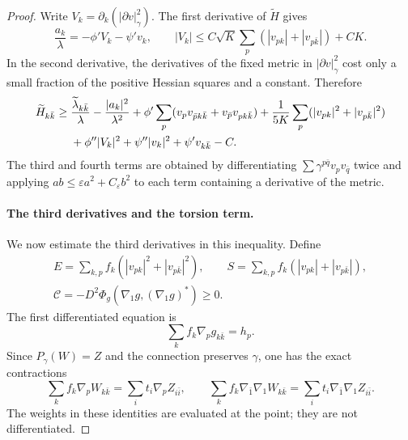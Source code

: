 \begin{proof}
Write $V_k=\partial_k(|\partial v|_\gamma^2)$. The first derivative of $\widetilde H$ gives
\begin{equation}\label{eq:stw-maximum-first}
 \frac{a_k}{\lambda}=-\phi' V_k-\psi'v_k,
 \qquad
 |V_k|\leq C\sqrt K\sum_p(|v_{pk}|+|v_{p\bar k}|)+CK.
\end{equation}
In the second derivative, the derivatives of the fixed metric in $|\partial v|_\gamma^2$ cost only a small fraction of the positive Hessian squares and a constant. Therefore
\begin{align}
 \widetilde H_{k\bar k}\geq{}&
  \frac{\widetilde\lambda_{k\bar k}}\lambda
       -\frac{|a_k|^2}{\lambda^2}
       +\phi'\sum_p(v_pv_{\bar p k\bar k}+v_{\bar p}v_{pk\bar k})
       +\frac1{5K}\sum_p(|v_{pk}|^2+|v_{p\bar k}|^2)\notag\\
 &+\phi''|V_k|^2+\psi''|v_k|^2+\psi'v_{k\bar k}-C.
 \label{eq:stw-maximum-second-preliminary}
\end{align}
The third and fourth terms are obtained by differentiating $\sum\gamma^{p\bar q}v_pv_{\bar q}$ twice and applying $ab\leq\varepsilon a^2+C_\varepsilon b^2$ to each term containing a derivative of the metric.

\paragraph{The third derivatives and the torsion term.}
We now estimate the third derivatives in this inequality. Define
\begin{gather*}
 E=\sum_{k,p} f_k(|v_{pk}|^2+|v_{p\bar k}|^2),\qquad
 S=\sum_{k,p} f_k(|v_{pk}|+|v_{p\bar k}|),\\
 \mathcal C=-D^2\Phi_g(\nabla_1g,(\nabla_1g)^*)\geq0.
\end{gather*}
The first differentiated equation is
\begin{equation}\label{eq:stw-first-differentiated}
 \sum_k f_k\nabla_p g_{k\bar k}=h_p.
\end{equation}
Since $P_\gamma(W)=Z$ and the connection preserves $\gamma$, one has the exact contractions
\begin{equation}\label{eq:stw-contraction-derivatives}
 \sum_k f_k\nabla_p W_{k\bar k}=\sum_i t_i\nabla_p Z_{i\bar i},
 \qquad
 \sum_k f_k\nabla_{\bar1}\nabla_1W_{k\bar k}
       =\sum_i t_i\nabla_{\bar1}\nabla_1Z_{i\bar i}.
\end{equation}
The weights in these identities are evaluated at the point; they are not differentiated.


\end{proof}
